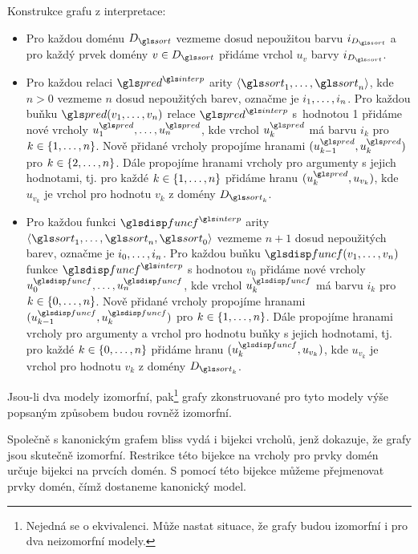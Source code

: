 Konstrukce grafu z interpretace:
\begin{itemize}
\item Pro každou doménu $D_\sort$ vezmeme dosud nepoužitou barvu $i_{D_\sort}$
  a pro každý prvek domény $v \in D_\sort$ přidáme vrchol $u_v$ barvy
  $i_{D_\sort}$.
\item Pro každou relaci $\pred^\interp$ arity
  $\langle \sort_1 \comdots \sort_n \rangle$, kde $n > 0$
  vezmeme $n$ dosud nepoužitých barev, označme je
  $i_1 , \ldots, i_n$.
  Pro každou buňku $\pred(v_1 \comdots v_n)$ relace $\pred^\interp$
  s~hodnotou 1 přidáme nové vrcholy $u_1^\pred \comdots u_n^\pred$,
  kde vrchol $u_k^\pred$ má barvu $i_k$ pro $k \in \{ 1 , \ldots, n \}$.
  Nově přidané vrcholy propojíme hranami $(u_{k-1}^\pred, u_k^\pred)$ pro
  $k \in \{ 2 , \ldots, n \}$. Dále propojíme hranami
  vrcholy pro argumenty s jejich hodnotami, tj. pro
  každé $k \in \{ 1 , \ldots, n \}$ přidáme hranu
  $(u_k^\pred, u_{v_k})$, kde $u_{v_k}$ je vrchol pro hodnotu
  $v_k$ z domény $D_{\sort_k}$.
\item Pro každou funkci $\func^\interp$ arity
  $\langle \sort_1 \comdots \sort_n, \sort_0 \rangle$
  vezmeme $n + 1$ dosud ne\-pou\-ži\-tých barev, označme je
  $i_0 , \ldots, i_n$.
  Pro každou buňku $\func(v_1 \comdots v_n)$ funkce $\func^\interp$
  s hodnotou $v_0$ přidáme nové vrcholy $u_0^\func \comdots u_n^\func$,
  kde vrchol $u_k^\func$ má barvu $i_k$ pro $k \in \{ 0 , \ldots, n \}$.
  Nově přidané vrcholy propojíme hranami $(u_{k-1}^\func, u_k^\func)$ pro
  $k \in \{ 1 , \ldots, n \}$. Dále propojíme hranami
  vrcholy pro argumenty a vrchol pro hodnotu buňky s jejich hodnotami, tj. pro
  každé $k \in \{ 0 , \ldots, n \}$ přidáme hranu
  $(u_k^\func, u_{v_k})$, kde $u_{v_k}$ je vrchol pro hodnotu
  $v_k$ z domény $D_{\sort_k}$.
\end{itemize}
Jsou-li dva modely izomorfní, pak\footnote{Nejedná se o ekvivalenci.
Může nastat situace, že grafy budou izomorfní i pro dva neizomorfní modely.}
grafy zkonstruované pro tyto modely výše popsaným způsobem budou
rovněž izomorfní.

%

Společně s kanonickým grafem bliss vydá i bijekci vrcholů,
jenž dokazuje, že grafy jsou skutečně izomorfní.
Restrikce této bijekce na vrcholy pro prvky domén
určuje bijekci na prvcích domén.
S pomocí této bijekce můžeme přejmenovat prvky
domén, čímž dostaneme kanonický model.

